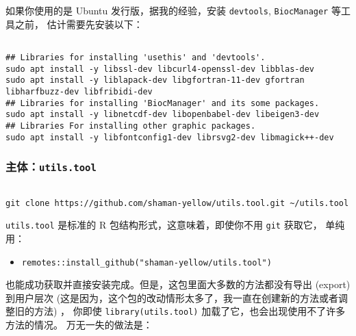 \documentclass[
]{article}
\providecommand{\tightlist}{%
  \setlength{\itemsep}{0pt}\setlength{\parskip}{0pt}}
\begin{document}
如果你使用的是 Ubuntu 发行版，据我的经验，安装 \texttt{devtools}, \texttt{BiocManager} 等工具之前，
估计需要先安装以下：

\begin{tcolorbox}[colback = gray!10, colframe = red!50, width = 16cm, arc = 1mm, auto outer arc, title = {Bash input}]
\begin{verbatim}

## Libraries for installing 'usethis' and 'devtools'.
sudo apt install -y libssl-dev libcurl4-openssl-dev libblas-dev
sudo apt install -y liblapack-dev libgfortran-11-dev gfortran libharfbuzz-dev libfribidi-dev
## Libraries for installing 'BiocManager' and its some packages.
sudo apt install -y libnetcdf-dev libopenbabel-dev libeigen3-dev
## Libraries For installing other graphic packages.
sudo apt install -y libfontconfig1-dev librsvg2-dev libmagick++-dev

\end{verbatim}
\end{tcolorbox}

\hypertarget{git}{%
\subsubsection{\texorpdfstring{主体：\texttt{utils.tool}}{主体：utils.tool}}\label{git}}

\begin{tcolorbox}[colback = gray!10, colframe = red!50, width = 16cm, arc = 1mm, auto outer arc, title = {Bash input}]
\begin{verbatim}

git clone https://github.com/shaman-yellow/utils.tool.git ~/utils.tool

\end{verbatim}
\end{tcolorbox}

\texttt{utils.tool} 是标准的 R 包结构形式，这意味着，即使你不用 \texttt{git} 获取它，
单纯用：

\begin{itemize}
\tightlist
\item
  \texttt{remotes::install\_github("shaman-yellow/utils.tool")}
\end{itemize}

也能成功获取并直接安装完成。但是，这包里面大多数的方法都没有导出 (export) 到用户层次
(这是因为，这个包的改动情形太多了，我一直在创建新的方法或者调整旧的方法) ，
你即使 \texttt{library(utils.tool)} 加载了它，也会出现使用不了许多方法的情况。
万无一失的做法是：
\end{document}
